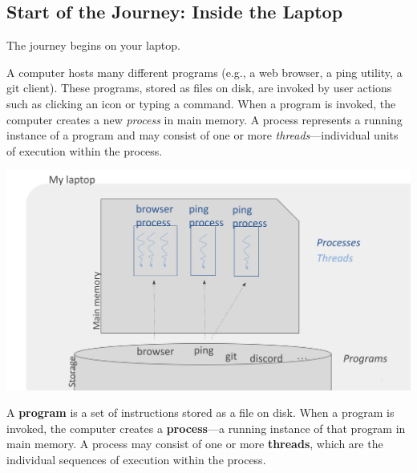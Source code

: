 \documentclass[../../compsys.tex]{subfiles}
\begin{document}
\subsection{Start of the Journey: Inside the Laptop}
The journey begins on your laptop.\\[5px] 
\begin{minipage}{0.45\textwidth}
  \begin{justify}
    A computer hosts many different programs (e.g., a web browser, a ping utility, a git client). These programs, stored as files on disk, are invoked by user actions such as clicking an icon or typing a command. When a program is invoked, the computer creates a new \emph{process} in main memory. A process represents a running instance of a program and may consist of one or more \emph{threads}—individual units of execution within the process.
  \end{justify}
\end{minipage}
\hfill
\vline
\hfill
\begin{minipage}{0.45\textwidth}
  \begin{center}
  \includegraphics[width=1.2\textwidth]{chapters/L1/images/threads.png}
\end{center}
\end{minipage}\vfill
\vfill
\begin{definition}
A \textbf{program} is a set of instructions stored as a file on disk. When a program is invoked, the computer creates a \textbf{process}—a running instance of that program in main memory. A process may consist of one or more \textbf{threads}, which are the individual sequences of execution within the process.
\end{definition}

\vfill
\end{document}
